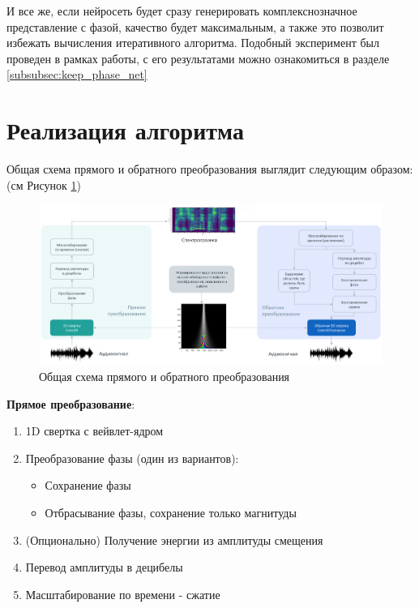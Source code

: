 И все же, если нейросеть будет сразу генерировать комплекснозначное представление с фазой, 
качество будет максимальным, а также это позволит избежать вычисления итеративного алгоритма.
Подобный эксперимент был проведен в рамках работы, с его результатами можно ознакомиться в разделе \ref{subsubsec:keep_phase_net}


\section{Реализация алгоритма}

Общая схема прямого и обратного преобразования выглядит следующим образом: (см Рисунок \ref{fig:algorithm_overview})

\clearpage

\begin{figure}
  \centering
  \includegraphics[width=0.9\linewidth]{figures/algorithm_overview}
  \caption{Общая схема прямого и обратного преобразования}
  \label{fig:algorithm_overview}
\end{figure}

\textbf{Прямое преобразование}:
\begin{enumerate}[1.]
  \item 1D свертка с вейвлет-ядром
  \item Преобразование фазы (один из вариантов):
    \begin{itemize}
      \item Сохранение фазы
      \item Отбрасывание фазы, сохранение только магнитуды
    \end{itemize}
  \item (Опционально) Получение энергии из амплитуды смещения
  \item Перевод амплитуды в децибелы
  \item Масштабирование по времени - сжатие
\end{enumerate}

